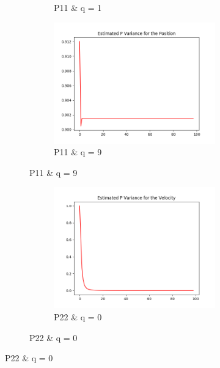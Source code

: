 \documentclass{article}
\begin{document}
\begin{figure}[H]
\begin{subfigure}{1\textwidth}
\begin{subfigure}{.3\textwidth}
                    \caption{P11 \& q = 1 }
                \end{subfigure}
                \begin{subfigure}{.3\textwidth}  
                    \includegraphics[width=1\linewidth]{./img/p11_9.png}
                    \caption[font=0.1mm]{P11 \& q = 9 }
                \end{subfigure}
            \end{subfigure}
            \begin{subfigure} {1\textwidth}    
                \begin{subfigure}{.3\textwidth}  
                    \includegraphics[width=1\linewidth]{./img/p22_0.png}
                    \caption{P22 \& q = 0 }

\end{subfigure}
\end{subfigure}
\end{figure}
\end{document}
